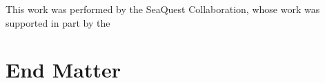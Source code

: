 \documentclass[reprint,aps,unsortedaddress,superscriptaddress,prl,floatfix,showpacs,linenumbers]{revtex4-2}
\begin{document}
\begin{acknowledgments}
	This work was performed by the SeaQuest Collaboration, whose work was supported in part by the
\end{acknowledgments}


\appendix
\section{End Matter}

\end{document}
